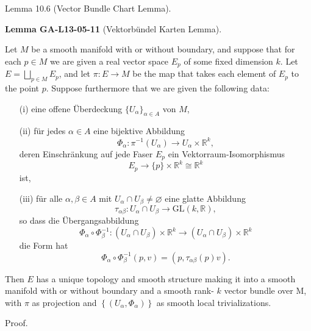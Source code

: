 \documentclass[10pt, letterpaper]{article}
\newcommand{\CustomHeading}[3]{%
  \par\medskip\noindent%
  \textbf{#1 #2} \textnormal{(#3)}.\enskip%
}
\newenvironment{LEM}[2]{\begin{unitbox}\CustomHeading{Lemma}{#1}{#2}}{\end{unitbox}}
\begin{document}
Lemma 10.6 (Vector Bundle Chart Lemma). 

\begin{LEM}{GA-L13-05-11}{Vektorbündel Karten Lemma}
Let $M$ be a smooth manifold with or without boundary, and suppose that for each $p \in M$ we are given a real vector space $E_p$ of some fixed dimension $k$. Let $E=\bigsqcup_{p \in M} E_p$, and let $\pi: E \rightarrow M$ be the map that takes each element of $E_p$ to the point $p$. Suppose furthermore that we are given the following data:
\begin{itemize}
  \item[(i)] eine offene Überdeckung \( \{ U_\alpha \}_{\alpha \in A} \) von \( M \),
  
  \item[(ii)] für jedes \( \alpha \in A \) eine bijektive Abbildung
  \[
  \Phi_\alpha: \pi^{-1}(U_\alpha) \rightarrow U_\alpha \times \mathbb{R}^k,
  \]
  deren Einschränkung auf jede Faser \( E_p \) ein Vektorraum-Isomorphismus
  \[
  E_p \to \{p\} \times \mathbb{R}^k \cong \mathbb{R}^k
  \]
  ist,
  
  \item[(iii)] für alle \( \alpha, \beta \in A \) mit \( U_\alpha \cap U_\beta \neq \varnothing \) eine glatte Abbildung
  \[
  \tau_{\alpha\beta} : U_\alpha \cap U_\beta \to \mathrm{GL}(k, \mathbb{R}),
  \]
  so dass die Übergangsabbildung
  \[
  \Phi_\alpha \circ \Phi_\beta^{-1} : (U_\alpha \cap U_\beta) \times \mathbb{R}^k \rightarrow (U_\alpha \cap U_\beta) \times \mathbb{R}^k
  \]
  die Form hat
  \[
  \Phi_\alpha \circ \Phi_\beta^{-1}(p, v) = \left(p, \tau_{\alpha\beta}(p) v\right).
  \]
\end{itemize}
Then $E$ has a unique topology and smooth structure making it into a smooth manifold with or without boundary and a smooth rank- $k$ vector bundle over M, with $\pi$ as projection and $\left\{\left(U_\alpha, \Phi_\alpha\right)\right\}$ as smooth local trivializations.
\end{LEM}



Proof. 
\end{document}
